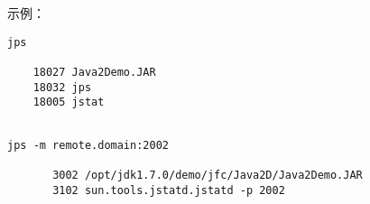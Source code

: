示例：

\begin{lstlisting}[language=cshell]
jps

    18027 Java2Demo.JAR
    18032 jps
    18005 jstat

\end{lstlisting}


\begin{lstlisting}[language=cshell]

jps -m remote.domain:2002

       3002 /opt/jdk1.7.0/demo/jfc/Java2D/Java2Demo.JAR
       3102 sun.tools.jstatd.jstatd -p 2002

    \end{lstlisting}